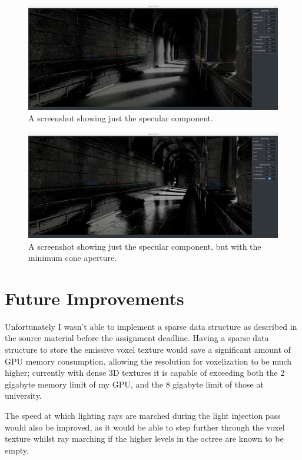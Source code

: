 \documentclass[]{acmsiggraph}
\begin{document}
\begin{figure}[htbp]\centering
\includegraphics[width=1.0\linewidth]{images/reflection_only}
\caption{\label{figure:specular}A screenshot showing just the specular component.}
\end{figure}
\begin{figure}[htbp]\centering
\includegraphics[width=1.0\linewidth]{images/reflection_only_no_roughness}
\caption{\label{figure:reflection}A screenshot showing just the specular component, but with the minimum cone aperture.}
\end{figure}

\section{Future Improvements} \label{section:improvements}

Unfortunately I wasn't able to implement a sparse data structure as described in the source material \cite{crassinneyretsainzgreeneisemann2011} before the assignment deadline. Having a sparse data structure to store the emissive voxel texture would save a significant amount of GPU memory consumption, allowing the resolution for voxelization to be much higher; currently with dense 3D textures it is capable of exceeding both the 2 gigabyte memory limit of my GPU, and the 8 gigabyte limit of those at university.

The speed at which lighting rays are marched during the light injection pass would also be improved, as it would be able to step further through the voxel texture whilst ray marching if the higher levels in the octree are known to be empty.
\end{document}
